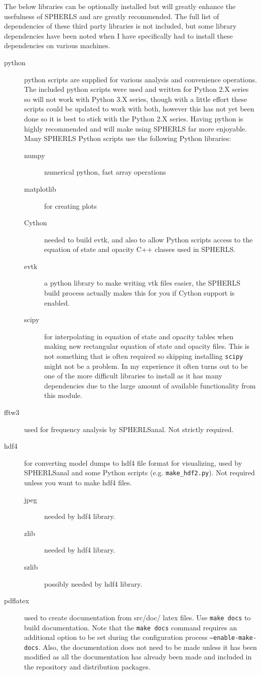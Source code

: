 \documentclass[12pt,a4paper]{book}
\begin{document}
The below libraries can be optionally installed but will greatly enhance the usefulness of SPHERLS and are greatly recommended. The full list of dependencies of these third party libraries is not included, but some library dependencies have been noted when I have specifically had to install these dependencies on various machines.
\begin{description}
\item[python] python scripts are supplied for various analysis and convenience operations.  The included python scripts were used and written for Python 2.X series so will not work with Python 3.X series, though with a little effort these scripts could be updated to work with both, however this has not yet been done so it is best to stick with the Python 2.X series. Having python is highly recommended and will make using SPHERLS far more enjoyable. Many SPHERLS Python scripts use the following Python libraries:
\begin{description}
  \item[numpy] numerical python, fast array operations
  \item[matplotlib] for creating plots
  \item[Cython] needed to build evtk, and also to allow Python scripts access to the equation of state and opacity C++ classes used in SPHERLS.
  \item[evtk] a python library to make writing vtk files easier, the SPHERLS build process actually makes this for you if Cython support is enabled.
  \item[scipy] for interpolating in equation of state and opacity tables when making new rectangular equation of state and opacity files. This is not something that is often required so skipping installing {\tt scipy} might not be a problem. In my experience it often turns out to be one of the more difficult libraries to install as it has many dependencies due to the large amount of available functionality from this module.
\end{description}
\item[fftw3] used for frequency analysis by SPHERLSanal. Not strictly required.
\item[hdf4] for converting model dumps to hdf4 file format for visualizing, used by SPHERLSanal and some Python scripts (e.g. {\tt make\_hdf2.py}). Not required unless you want to make hdf4 files.
\begin{description}
  \item[jpeg] needed by hdf4 library.
  \item[zlib] needed by hdf4 library.
  \item[szlib] possibly needed by hdf4 library.
\end{description}
\item[pdflatex] used to create documentation from src/doc/ latex files. Use {\tt make docs} to build documentation. Note that the {\tt make docs} command requires an additional option to be set during the configuration process {\tt --enable-make-docs}. Also, the documentation does not need to be made unless it has been modified as all the documentation has already been made and included in the repository and distribution packages.
\end{description}
\end{document}
